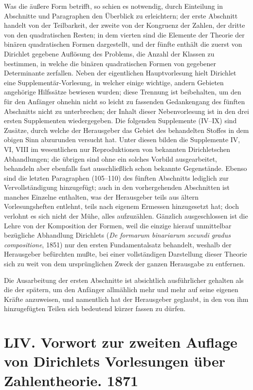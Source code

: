 \documentclass[11pt]{article}
\newcommand{\origpage}[1]{\par\vspace{0.25em}\noindent{\footnotesize\itshape [Gedruckte Seite #1]}\par\vspace{0.25em}}
\begin{document}
\origpage{395}
Was die äußere Form betrifft, so schien es notwendig, durch Einteilung in Abschnitte und Paragraphen den Überblick zu erleichtern; der erste Abschnitt handelt von der Teilbarkeit, der zweite von der Kongruenz der Zahlen, der dritte von den quadratischen Resten; in dem vierten sind die Elemente der Theorie der binären quadratischen Formen dargestellt, und der fünfte enthält die zuerst von Dirichlet gegebene Auflösung des Problems, die Anzahl der Klassen zu bestimmen, in welche die binären quadratischen Formen von gegebener Determinante zerfallen. Neben der eigentlichen Hauptvorlesung hielt Dirichlet eine Supplementär-Vorlesung, in welcher einige wichtige, andern Gebieten angehörige Hilfssätze bewiesen wurden; diese Trennung ist beibehalten, um den für den Anfänger ohnehin nicht so leicht zu fassenden Gedankengang des fünften Abschnitts nicht zu unterbrechen; der Inhalt dieser Nebenvorlesung ist in den drei ersten Supplementen wiedergegeben. Die folgenden Supplemente (IV--IX) sind Zusätze, durch welche der Herausgeber das Gebiet des behandelten Stoffes in dem obigen Sinn abzurunden versucht hat. Unter diesen bilden die Supplemente IV, VI, VIII im wesentlichen nur Reproduktionen von bekannten Dirichletschen Abhandlungen; die übrigen sind ohne ein solches Vorbild ausgearbeitet, behandeln aber ebenfalls fast ausschließlich schon bekannte Gegenstände. Ebenso sind die letzten Paragraphen (105--110) des fünften Abschnitts lediglich zur Vervollständigung hinzugefügt; auch in den vorhergehenden Abschnitten ist manches Einzelne enthalten, was der Herausgeber teils aus ältern Vorlesungsheften entlehnt, teils nach eigenem Ermessen hinzugesetzt hat; doch verlohnt es sich nicht der Mühe, alles aufzuzählen. Gänzlich ausgeschlossen ist die Lehre von der Komposition der Formen, weil die einzige hierauf unmittelbar bezügliche Abhandlung Dirichlets (\textit{De formarum binariarum secundi gradus compositione}, 1851) nur den ersten Fundamentalsatz behandelt, weshalb der Herausgeber befürchten mußte, bei einer vollständigen Darstellung dieser Theorie sich zu weit von dem ursprünglichen Zweck der ganzen Herausgabe zu entfernen.

\origpage{396}
Die Ausarbeitung der ersten Abschnitte ist absichtlich ausführlicher gehalten als die der spätern, um den Anfänger allmählich mehr und mehr auf seine eigenen Kräfte anzuweisen, und namentlich hat der Herausgeber geglaubt, in den von ihm hinzugefügten Teilen sich bedeutend kürzer fassen zu dürfen.

\section*{LIV. Vorwort zur zweiten Auflage von Dirichlets Vorlesungen über Zahlentheorie. 1871}
\end{document}
